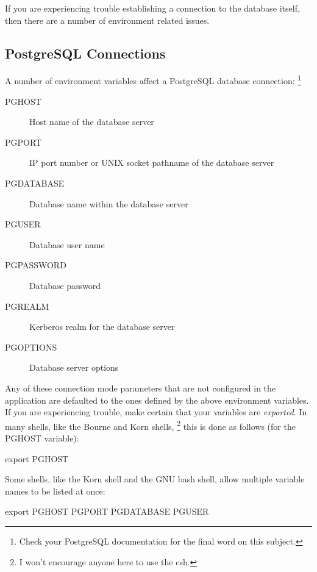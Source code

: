 \documentclass[english,letterpaper]{book}
\begin{document}
If you are experiencing trouble establishing a connection to the database
itself, then there are a number of environment related issues.


\subsection{PostgreSQL Connections}

A number of environment variables affect a PostgreSQL database connection:%
\footnote{Check your PostgreSQL documentation for the final word on this subject.%
}

\begin{description}
   \item [PGHOST]Host name of the database server
   \item [PGPORT]IP port number or UNIX socket pathname of the database server
   \item [PGDATABASE]Database name within the database server
   \item [PGUSER]Database user name
   \item [PGPASSWORD]Database password
   \item [PGREALM]Kerberos realm for the database server
   \item [PGOPTIONS]Database server options
\end{description}

Any of these connection mode parameters that are not configured in
the application are defaulted to the ones defined by the above environment
variables. If you are experiencing trouble, make certain that your
variables are \emph{exported}. In many shells, like the Bourne and
Korn shells,%
\footnote{I won't encourage anyone here to use the csh.%
} this is done as follows (for the PGHOST variable):

\begin{Example}

   export PGHOST

\end{Example}

Some shells, like the Korn shell and the GNU bash shell, allow multiple
variable names to be listed at once:

\begin{Example}

   export PGHOST PGPORT PGDATABASE PGUSER

\end{Example}
\end{document}
